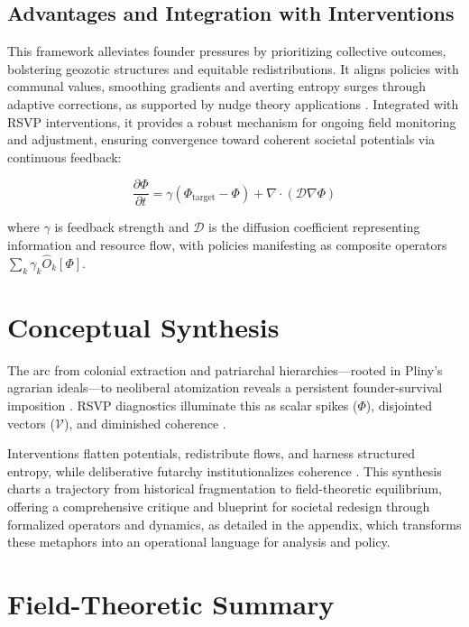 \documentclass[11pt]{article}
\begin{document}
\subsection{Advantages and Integration with Interventions}

This framework alleviates founder pressures by prioritizing collective outcomes, bolstering geozotic structures and equitable redistributions. It aligns policies with communal values, smoothing gradients and averting entropy surges through adaptive corrections, as supported by nudge theory applications \citep{sunstein2008nudge}. Integrated with RSVP interventions, it provides a robust mechanism for ongoing field monitoring and adjustment, ensuring convergence toward coherent societal potentials via continuous feedback:

\begin{equation}
\frac{\partial \Phi}{\partial t} = \gamma (\Phi_{\text{target}} - \Phi) + \nabla \cdot (\mathcal{D} \nabla \Phi)
\end{equation}

where $\gamma$ is feedback strength and $\mathcal{D}$ is the diffusion coefficient representing information and resource flow, with policies manifesting as composite operators $\sum_{k} \gamma_k \hat{O}_k[\Phi]$.

\section{Conceptual Synthesis}

The arc from colonial extraction and patriarchal hierarchies—rooted in Pliny's agrarian ideals—to neoliberal atomization reveals a persistent founder-survival imposition \citep{pliny77, linebaugh2008magna, stone1977family}. RSVP diagnostics illuminate this as scalar spikes ($\Phi$), disjointed vectors ($\mathcal{V}$), and diminished coherence \citep{ptvv2013shifted, carney2015emergent}.

Interventions flatten potentials, redistribute flows, and harness structured entropy, while deliberative futarchy institutionalizes coherence \citep{hanson2007shall, landemore2020open}. This synthesis charts a trajectory from historical fragmentation to field-theoretic equilibrium, offering a comprehensive critique and blueprint for societal redesign through formalized operators and dynamics, as detailed in the appendix, which transforms these metaphors into an operational language for analysis and policy.

\section{Field-Theoretic Summary}
\end{document}
